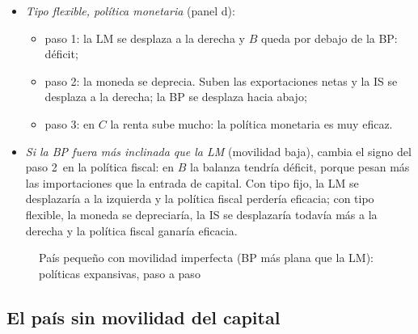 \documentclass[11pt]{article}
\begin{document}
\begin{itemize}
\begin{itemize}
  \item paso 3: en $C$ la renta sube algo: la política fiscal tiene una eficacia parcial, mayor cuanto menor es la movilidad del capital.
  \end{itemize}
\item \emph{Tipo flexible, política monetaria} (panel d):
  \begin{itemize}
  \item paso 1: la LM se desplaza a la derecha y $B$ queda por debajo de la BP: déficit;
  \item paso 2: la moneda se deprecia. Suben las exportaciones netas y la IS se desplaza a la derecha; la BP se desplaza hacia abajo;
  \item paso 3: en $C$ la renta sube mucho: la política monetaria es muy eficaz.
  \end{itemize}
\item \emph{Si la BP fuera más inclinada que la LM} (movilidad baja), cambia el signo del paso 2~en la política fiscal: en $B$ la balanza tendría déficit, porque pesan más las importaciones que la entrada de capital. Con tipo fijo, la LM se desplazaría a la izquierda y la política fiscal perdería eficacia; con tipo flexible, la moneda se depreciaría, la IS se desplazaría todavía más a la derecha y la política fiscal ganaría eficacia.
\end{itemize}

\begin{figure}[H]
\centering
\caption{País pequeño con movilidad imperfecta (BP más plana que la LM): políticas expansivas, paso a paso}\label{fig:mf-pequeno-imperfecta}
\end{figure}

\subsection*{El país sin movilidad del capital}
\end{document}
